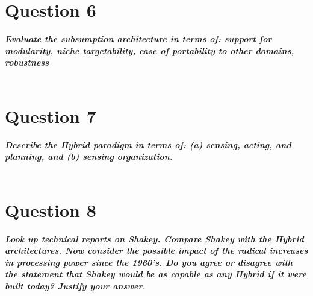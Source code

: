 \documentclass{article}
\newcommand\tab[1][1cm]{\hspace*{#1}}
\begin{document}
\section*{Question 6}
\textbf{\textit{
    \tab Evaluate  the  subsumption  architecture  in  terms  of:  support  for modularity, niche targetability, ease of portability to other domains, robustness
}} \\ \\

\section*{Question 7}
\textbf{\textit{
    \tab Describe the Hybrid paradigm in terms of: (a) sensing, acting, and planning, and (b) sensing organization.
}} \\ \\
\section*{Question 8}
\textbf{\textit{
    \tab Look up technical reports on Shakey. Compare Shakey with the Hybrid
architectures.  Now  consider  the  possible  impact  of the  radical  increases  in
processing power since the 1960’s. Do you agree or disagree with the statement that
Shakey would be as capable as any Hybrid if it were built today? Justify your answer.
}} \\ \\
\end{document}
